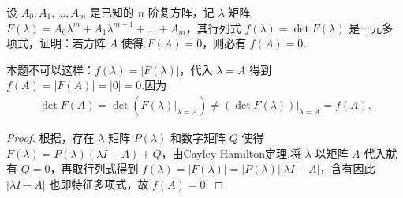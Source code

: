 \documentclass[../../main.tex]{subfiles}
\begin{document}
\begin{example}
设 $A_0,A_1,\dots,A_m$ 是已知的 $n$ 阶复方阵，记 $\lambda$ 矩阵 $F(\lambda)=A_0\lambda^m + A_1\lambda^{m - 1} + \dots + A_m$，其行列式 $f(\lambda)=\det F(\lambda)$ 是一元多项式，证明：若方阵 $A$ 使得 $F(A)=0$，则必有 $f(A)=0$.
\end{example}
\begin{remark}
本题不可以这样：$f(\lambda)=|F(\lambda)|$，代入 $\lambda = A$ 得到 $f(A)=|F(A)|=|0|=0$.因为
\begin{align*}
\det F\left( A \right) =\det \left( F\left( \lambda \right) |_{\lambda =A} \right) \ne \left( \det F\left( \lambda \right) \right) |_{\lambda =A}=f\left( A \right) .
\end{align*}
\end{remark}
\begin{proof}
根据，存在 $\lambda$ 矩阵 $P(\lambda)$ 和数字矩阵 $Q$ 使得 $F(\lambda)=P(\lambda)(\lambda I - A)+Q$，由\hyperref[theorem:Cayley-Hamilton定理]{Cayley-Hamilton定理},将 $\lambda$ 以矩阵 $A$ 代入就有 $Q = 0$，再取行列式得到 $f(\lambda)=|F(\lambda)|=|P(\lambda)||\lambda I - A|$，含有因此 $|\lambda I - A|$ 也即特征多项式，故 $f(A)=0.$

\end{proof}
\end{document}
